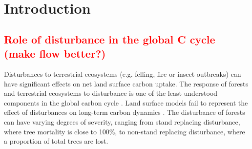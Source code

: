 \documentclass[draft,linenumbers]{agujournal}
\begin{document}
%
% 
% 
% 


\section{Introduction}

\subsection{\textcolor{red}{Role of disturbance in the global C cycle (make flow better?)}}
Disturbances to terrestrial ecosystems (e.g. felling, fire or insect outbreaks) can have significant effects on net land surface carbon uptake. The response of forests and terrestrial ecosystems to disturbance is one of the least understood components in the global carbon cycle \citep{ciais2014carbon}. Land surface models fail to represent the effect of disturbances on long-term carbon dynamics \citep{running2008ecosystem}. The disturbance of forests can have varying degrees of severity, ranging from stand replacing disturbance, where tree mortality is close to 100\%, to non-stand replacing disturbance, where a proportion of total trees are lost.
\end{document}
